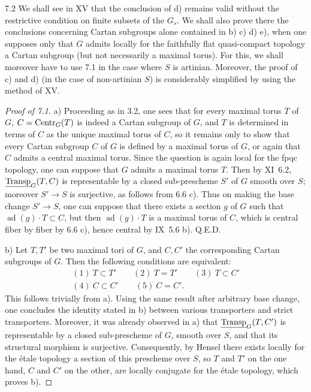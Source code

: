 \begin{remarks}{7.2}\label{XII.7.2}
We shall see in XV that the conclusion of d) remains valid without the restrictive condition on finite subsets of the $G_s$. We shall also prove there the conclusions concerning Cartan subgroups alone contained in b) c) d) e), when one supposes only that $G$ admits locally for the faithfully flat quasi-compact topology a Cartan subgroup (but not necessarily a maximal torus). For this, we shall moreover have to use 7.1 in the case where $S$ is artinian. Moreover, the proof of c) and d) (in the case of non-artinian $S$) is considerably simplified by using the method of XV.
\end{remarks}
\begin{proof}[Proof of 7.1]
a) Proceeding as in 3.2, one sees that for every maximal torus $T$ of $G$, $C=\operatorname{Centr}_G(T)$ is indeed a Cartan subgroup of $G$, and $T$ is determined in terms of $C$ as the unique maximal torus of $C$, so it remains only to show that every Cartan subgroup $C$ of $G$ is defined by a maximal torus of $G$, or again that $C$ admits a central maximal torus. Since the question is again local for the fpqc topology, one can suppose that $G$ admits a maximal torus $T$. Then by XI~6.2, $\underline{\operatorname{Transp}}_G(T,C)$ is representable by a closed sub-prescheme $S'$ of $G$ smooth over $S$; moreover $S'\to S$ is surjective, as follows from 6.6 c). Thus on making the base change $S'\to S$, one can suppose that there exists a section $g$ of $G$ such that $\operatorname{ad}(g)\cdot T\subset C$, but then $\operatorname{ad}(g)\cdot T$ is a maximal torus of $C$, which is central fiber by fiber by 6.6 c), hence central by IX~5.6 b). \hfill Q.E.D.

b) Let $T,T'$ be two maximal tori of $G$, and $C,C'$ the corresponding Cartan subgroups of $G$. Then the following conditions are equivalent:
\[
\begin{gathered}
(1)\ T\subset T'\qquad(2)\ T=T'\qquad(3)\ T\subset C'\\
(4)\ C\subset C'\qquad(5)\ C=C'.
\end{gathered}
\]
This follows trivially from a). Using the same result after arbitrary base change, one concludes the identity stated in b) between various transporters and strict transporters. Moreover, it was already observed in a) that $\underline{\operatorname{Transp}}_G(T,C')$ is representable by a closed sub-prescheme of $G$, smooth over $S$, and that its structural morphism is surjective. Consequently, by Hensel there exists locally for the étale topology a section of this prescheme over $S$, so $T$ and $T'$ on the one hand, $C$ and $C'$ on the other, are locally conjugate for the étale topology, which proves b).


\end{proof}
